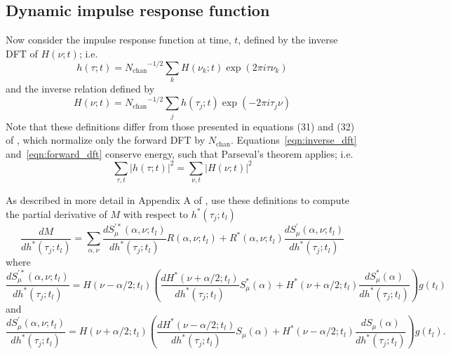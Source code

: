 \documentclass[manuscript]{aastex631}
\newcommand{\Nchan}{\ensuremath{N_\mathrm{chan}}}
\begin{document}



\subsection{Dynamic impulse response function}

Now consider the impulse response function at time, $t$, defined by the inverse DFT of $H(\nu;t)$; i.e.
\begin{equation}
    h(\tau;t) = \Nchan^{-1/2} \sum_k H(\nu_k; t) \exp(2\pi i \tau \nu_k)
    \label{eqn:inverse_dft}
\end{equation}
and the inverse relation defined by 
\begin{equation}
    H(\nu;t) = \Nchan^{-1/2} \sum_j h(\tau_j; t) \exp(- 2\pi i \tau_j \nu)
    \label{eqn:forward_dft}
\end{equation}
%
Note that these definitions differ from those presented in equations (31) and (32) of \cite{wdv13},
which normalize only the forward DFT by \Nchan.  Equations~\ref{eqn:inverse_dft} and~\ref{eqn:forward_dft}
conserve energy, such that Parseval's theorem applies; i.e.
\begin{equation}
\sum_{\tau,t} |h(\tau;t)|^2 = \sum_{\nu,t} |H(\nu;t)|^2
\end{equation}

As described in more detail in Appendix A of \cite{ow23}, use these definitions to compute the partial derivative of $M$ with respect to $h^*(\tau_j;t_l)$
\begin{equation}
    \frac{dM}{dh^*(\tau_j;t_l)}
    = \sum_{\alpha,\nu}
    \frac{dS_\mu^{\prime*}(\alpha,\nu;t_l)}{dh^*(\tau_j;t_l)} R(\alpha,\nu;t_l) +
    R^*(\alpha,\nu;t_l) \frac{dS^\prime_\mu(\alpha,\nu;t_l)}{dh^*(\tau_j;t_l)} 
\label{eqn:dM_dh}
\end{equation}
%
where
\begin{equation}
\frac{dS_\mu^{\prime*}(\alpha,\nu;t_l)}{dh^*(\tau_j;t_l)}
    = H(\nu-\alpha/2;t_l) \left( \frac{dH^*(\nu+\alpha/2;t_l)}{dh^*(\tau_j;t_l)} S_\mu^*(\alpha)
                                + H^*(\nu+\alpha/2;t_l) \frac{dS_\mu^*(\alpha)}{dh^*(\tau_j;t_l)} \right) g(t_l)
\label{eqn:dSconj_dh_degenerate}
\end{equation}
%
and
\begin{equation}
\frac{dS^\prime_\mu(\alpha,\nu;t_l)}{dh^*(\tau_j;t_l)}
    = H(\nu+\alpha/2;t_l) \left( \frac{dH^*(\nu-\alpha/2;t_l)}{dh^*(\tau_j;t_l)} S_\mu(\alpha)
                                + H^*(\nu-\alpha/2;t_l) \frac{dS_\mu(\alpha)}{dh^*(\tau_j;t_l)} \right) g(t_l).
\label{eqn:dS_dh_degenerate}
\end{equation}
%
\end{document}
